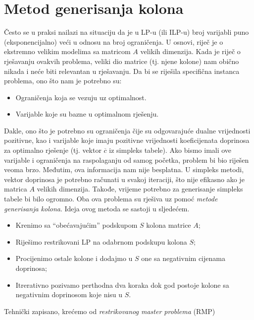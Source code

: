 \documentclass[a4paper, utf8, 11pt, colorlinks]{book}
\begin{document}
\section{Metod generisanja kolona}%

Često se u praksi nailazi na situaciju da je u LP-u (ili ILP-u) broj varijabli puno (eksponencijalno) veći  u odnosu na broj ograničenja. U osnovi, riječ je o ekstremno velikim modelima sa matricom $A$ velikih dimenzija. Kada je riječ o rješavanju ovakvih problema, veliki dio matrice (tj. njene kolone) nam obično nikada i neće biti relevantan u rješavanju. Da bi se riješila specifična instanca problema, ono što nam je potrebno su:
\begin{itemize}
    \item Ograničenja koja se vezuju uz optimalnost.
    \item Varijable koje su bazne u optimalnom rješenju.
\end{itemize}
Dakle, ono što je potrebno su ograničenja čije su odgovarajuće dualne vrijednosti pozitivne, kao i varijable koje imaju pozitivne vrijednosti koeficijenata doprinosa za optimalno rješenje (tj. vektor  $\overline{c}$ iz simpleks tabele). Ako bismo imali ove varijable i ograničenja na raspolaganju od samog početka, problem bi bio riješen veoma brzo. Međutim, ova informacija nam nije besplatna.  U simpleks metodi, vektor doprinosa je potrebno računati u svakoj iteraciji, što nije efikasno ako je matrica $A$ velikih dimenzija. Takođe, vrijeme potrebno za generisanje simpleks tabele bi bilo ogromno.  Oba ova problema su rješiva uz pomoć \emph{metode generisanja kolona}.  Ideja ovog metoda se sastoji u sljedećem. 
\begin{itemize}
    \item Krenimo sa ``obećavajućim'' podskupom $S$ kolona matrice $A$; 
    \item Riješimo restrikovani LP na odabrnom podskupu kolona $S$; 
    \item Procijenimo ostale kolone i dodajmo u $S$ one sa negativnim 
          cijenama doprinosa;
    \item Itrerativno pozivamo perthodna dva koraka dok god postoje kolone   sa negativnim doprinosom koje nisu u $S$.
\end{itemize}
Tehnički zapisano, krećemo od \emph{restrikovanog master problema} (RMP)
\end{document}

